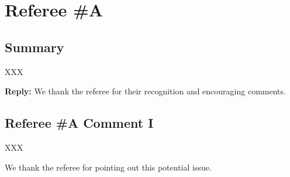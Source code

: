 


\section{Referee \#A}
\label{sec:rev:1}

\subsection{Summary}
XXX

\textbf{Reply: }We thank the referee for their recognition and encouraging comments.

\subsection{Referee \#A Comment I}

XXX

\begin{response}
\label{res:rev1:com1}

We thank the referee for pointing out this potential issue. 

\end{response}
